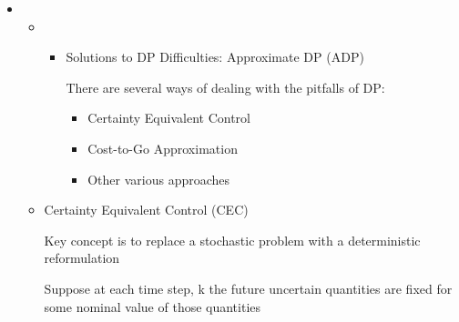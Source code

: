 \documentclass[12pt,twoside]{article}
\begin{document}
\vspace{\baselineskip}
\begin{itemize}
	\item \begin{itemize}
	\item \begin{itemize}
	\item Solutions to DP Difficulties: Approximate DP (ADP)\par


\vspace{\baselineskip}
{\fontsize{10pt}{12.0pt}\selectfont There are several ways of dealing with the pitfalls of DP:\par}\par


\vspace{\baselineskip}
\begin{itemize}
	\item {\fontsize{10pt}{12.0pt}\selectfont Certainty Equivalent Control\par}\par

	\item {\fontsize{10pt}{12.0pt}\selectfont Cost-to-Go Approximation\par}\par

	\item {\fontsize{10pt}{12.0pt}\selectfont Other various approaches\par}\par


\vspace{\baselineskip}

\end{itemize}
\end{itemize}
	\item Certainty Equivalent Control (CEC)\par


\vspace{\baselineskip}
{\fontsize{10pt}{12.0pt}\selectfont Key concept is to replace a stochastic problem with a deterministic reformulation\par}\par

{\fontsize{10pt}{12.0pt}\selectfont Suppose at each time step, k the future uncertain quantities are fixed for some nominal value of those quantities\par}\par


\end{itemize}
\end{itemize}
\end{document}
